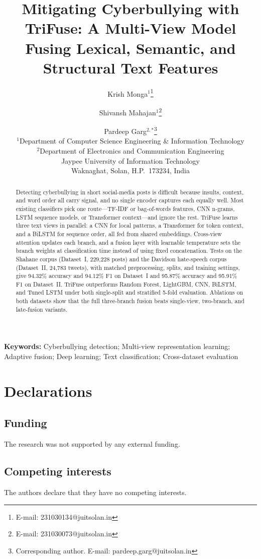 \documentclass[11pt,a4paper]{article}
\title{\textbf{Mitigating Cyberbullying with TriFuse: A Multi-View Model Fusing Lexical, Semantic, and Structural Text Features}}
\author{%
Krish Monga$^{1}$\thanks{E-mail: 231030134@juitsolan.in}\and
Shivansh Mahajan$^{1}$\thanks{E-mail: 231030073@juitsolan.in}\and
Pardeep Garg$^{2,*}$\thanks{Corresponding author. E-mail: pardeep.garg@juitsolan.in}\\[0.6em]
\small $^{1}$Department of Computer Science Engineering \& Information Technology\\
\small $^{2}$Department of Electronics and Communication Engineering\\
\small Jaypee University of Information Technology\\
\small Waknaghat, Solan, H.P.\ 173234, India
}
\date{}
\begin{document}
\maketitle

\begin{abstract}
Detecting cyberbullying in short social-media posts is difficult because insults, context, and word order all carry signal, and no single encoder captures each equally well. Most existing classifiers pick one route---TF-IDF or bag-of-words features, CNN n-grams, LSTM sequence models, or Transformer context---and ignore the rest. TriFuse learns three text views in parallel: a CNN for local patterns, a Transformer for token context, and a BiLSTM for sequence order, all fed from shared embeddings. Cross-view attention updates each branch, and a fusion layer with learnable temperature sets the branch weights at classification time instead of using fixed concatenation. Tests on the Shahane corpus (Dataset~I, 229,228 posts) and the Davidson hate-speech corpus (Dataset~II, 24,783 tweets), with matched preprocessing, splits, and training settings, give 94.32\% accuracy and 94.12\% F1 on Dataset~I and 95.87\% accuracy and 95.91\% F1 on Dataset~II. TriFuse outperforms Random Forest, LightGBM, CNN, BiLSTM, and Tuned LSTM under both single-split and stratified 5-fold evaluation. Ablations on both datasets show that the full three-branch fusion beats single-view, two-branch, and late-fusion variants.
\end{abstract}

\noindent\textbf{Keywords:} Cyberbullying detection; Multi-view representation learning; Adaptive fusion; Deep learning; Text classification; Cross-dataset evaluation



\section*{Declarations}

\subsection*{Funding}
The research was not supported by any external funding.

\subsection*{Competing interests}
The authors declare that they have no competing interests.
\end{document}
